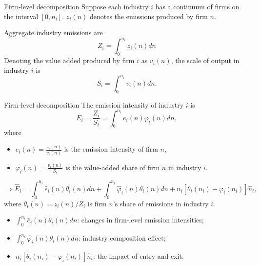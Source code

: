 \documentclass{beamer}
\begin{document}
\begin{frame}{Firm-level decomposition}
	Suppose each industry $i$ has a continuum of firms on the interval $[0,n_i]$. $z_i(n)$ denotes the emissions produced by firm $n$.
	\medskip

	Aggregate industry emissions are
	\begin{equation}
		Z_i=\int_0^{n_i}z_i(n)dn
	\end{equation}
	Denoting the value added produced by firm $i$ as $v_i(n)$, the scale of output in industry $i$ is
	\begin{equation}
		S_i=\int_0^{n_i}v_i(n)dn.
	\end{equation}
\end{frame}
\begin{frame}{Firm-level decomposition}
	The emission intensity of industry $i$ is
	\begin{equation}
		E_i=\frac{Z_i}{S_i}=\int_0^{n_i}e_i(n)\varphi_i(n)dn,
	\end{equation}
	where
	\begin{itemize}
		\item $e_i(n)=\frac{z_i(n)}{v_i(n)}$ is the emission intensity of firm $n$,
		\item $\varphi_i(n)=\frac{v_i(n)}{S_i}$ is the value-added share of firm $n$ in industry $i$.
	\end{itemize}
	\medskip
	\begin{equation}
		\Rightarrow \hat{E}_i=\int_0^{n_i}\hat{e}_i(n)\theta_i(n)dn + \int_0^{n_i}\hat{\varphi}_i(n)\theta_i(n)dn + n_i[\theta_i(n_i)-\varphi_i(n_i)]\hat{n}_i,
	\end{equation}
	where $\theta_i(n)=z_i(n)/Z_i$ is firm $n$'s share of emissions in industry $i$.
	\medskip
	\begin{itemize}
		\item $\int_0^{n_i}\hat{e}_i(n)\theta_i(n)dn$: changes in firm-level emission intensities;
		\item $\int_0^{n_i}\hat{\varphi}_i(n)\theta_i(n)dn$: industry composition effect;
		\item $n_i[\theta_i(n_i)-\varphi_i(n_i)]\hat{n}_i$: the impact of entry and exit.
	\end{itemize}
\end{frame}
\end{document}
